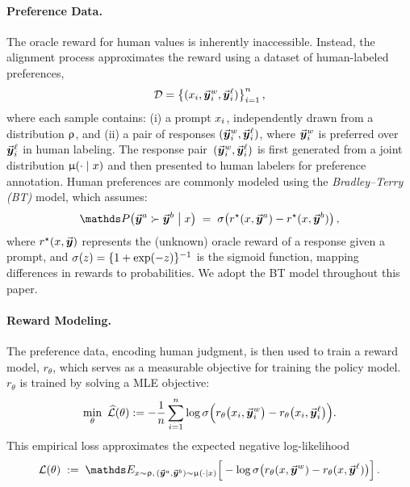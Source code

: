 	\paragraph{Preference Data.} The oracle reward for human values is inherently inaccessible. Instead, the alignment process approximates the reward using a dataset of human-labeled preferences,
	\begin{align*}
		\mathcal{D} = \big\{ (x_{i}, \vec{\boldsymbol{y}}\!\,^w_{i}, \vec{\boldsymbol{y}}\!\,^{\ell}_{i}) \big\}_{i=1}^{n} \, ,
	\end{align*}
	where each sample contains: (i) a prompt $ x_{i}$, independently drawn from a distribution $ \uprho$, and (ii) a pair of responses $(\vec{\boldsymbol{y}}\!\,^w_{i}, \vec{\boldsymbol{y}}\!\,^{\ell}_{i})$, where $\vec{\boldsymbol{y}}\!\,^w_{i}$ is preferred over $\vec{\boldsymbol{y}}\!\,^{\ell}_{i}$ in human labeling. The response pair~\mbox{$(\vec{\boldsymbol{y}}\!\,^w_{i}, \vec{\boldsymbol{y}}\!\,^{\ell}_{i})$} is first generated from a joint distribution $\upmu(\cdot \mid x)$ 
    and then presented to human labelers for preference annotation. Human preferences are commonly modeled using the \emph{Bradley–Terry (BT)} model, which assumes: \begin{align}
			\label{eq:BT}
			\Prob\big( \responseone \succ \responsetwo \bigm| \prompt \big)
			\; = \; \sigmoid\big( \rewardstar(\prompt, \responseone) - \rewardstar(\prompt, \responsetwo) \big) \, ,
		\end{align}
		where $r^{\star}(x, \vec{\boldsymbol{y}}\!\,)$ represents the (unknown) oracle reward of a response given a prompt, and $\sigma(z) = \{ 1 + \exp(-z) \}^{-1}$ is the sigmoid function, mapping differences in rewards to probabilities. We adopt the BT model throughout this paper.

    \paragraph{Reward Modeling.} The preference data, encoding human judgment, is then used to train a reward model, $r_\theta$, which serves as a measurable objective for training the policy model. $r_\theta$ is trained by solving a MLE objective:
\begin{align}
		\label{eq:RM_objective}
		\min_{\theta} \
        \widehat{\mathcal{L}}(\theta) :=
		- \frac{1}{n} \sum_{i=1}^{n} \log \sigma \Big( r_{\theta}\big(x_{i}, \vec{\boldsymbol{y}}\!\,^w_{i}\big) - r_{\theta}\big(x_{i}, \vec{\boldsymbol{y}}\!\,^{\ell}_{i}\big) \Big).
	\end{align}
%
    This empirical loss approximates the expected negative log-likelihood
	\begin{align}
		\label{eq:def_Loss}
        \Loss(\paratheta) \; := \;
		\Exp_{\prompt \sim \promptdistr, \,(\responseone, \responsetwo) \sim \responsedistr(\cdot \mid \prompt)} \Big[ - \log \sigmoid \big( \rewardtheta(\prompt, \responsewin) - \rewardtheta(\prompt, \responselose ) \big) \Big] \, .
	\end{align}
    

